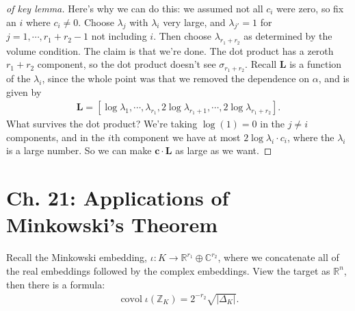 \begin{proof}[of key lemma]
Here's why we can do this: we assumed not all \(c_i\) were zero, so fix
an \(i\) where \(c_i\neq 0\). Choose \(\lambda_j\) with \(\lambda_i\)
very large, and \(\lambda_{j'} =1\) for \(j=1, \cdots, r_1 + r_2 - 1\)
not including \(i\). Then choose \(\lambda_{r_1 + r_2}\) as determined
by the volume condition. The claim is that we're done. The dot product
has a zeroth \(r_1 + r_2\) component, so the dot product doesn't see
\(\sigma_{r_1 + r_2}\). Recall \(\mathbf{L}\) is a function of the
\(\lambda_i\), since the whole point was that we removed the dependence
on \(\alpha\), and is given by
\begin{align*}
\mathbf{L} = {\left[ {
\log \lambda_1, \cdots, \lambda_{r_1}, 2\log \lambda_{r_1 + 1}, \cdots, 2\log \lambda_{r_1 + r_2}
} \right]}
.\end{align*}
What survives the dot product? We're taking \(\log(1) = 0\) in the
\(j\neq i\) components, and in the \(i\)th component we have at most
\(2\log \lambda_i \cdot c_i\), where the \(\lambda_i\) is a large
number. So we can make \(\mathbf{c} \cdot \mathbf{L}\) as large as we
want.

\end{proof}

\hypertarget{ch.-21-applications-of-minkowskis-theorem}{%
\section{Ch. 21: Applications of Minkowski's
Theorem}\label{ch.-21-applications-of-minkowskis-theorem}}

\begin{proposition}[?]

Recall the Minkowski embedding,
\(\iota: K\to {\mathbb{R}}^{r_1} \oplus {\mathbb{C}}^{r_2}\), where we
concatenate all of the real embeddings followed by the complex
embeddings. View the target as \({\mathbb{R}}^n\), then there is a
formula:
\begin{align*}
\operatorname{covol}\iota({\mathbb{Z}}_K) = 2^{-r_2} \sqrt{ {\left\lvert { {\Delta}_K } \right\rvert}}
.\end{align*}

\end{proposition}

